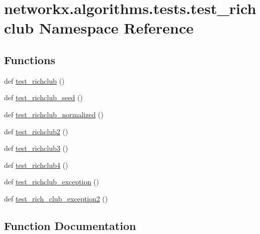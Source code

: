 \hypertarget{namespacenetworkx_1_1algorithms_1_1tests_1_1test__richclub}{}\section{networkx.\+algorithms.\+tests.\+test\+\_\+richclub Namespace Reference}
\label{namespacenetworkx_1_1algorithms_1_1tests_1_1test__richclub}
\subsection*{Functions}
\begin{DoxyCompactItemize}
\item 
def \hyperlink{namespacenetworkx_1_1algorithms_1_1tests_1_1test__richclub_ac3bf15ad9328aa5dfafd7df39ccbac00}{test\+\_\+richclub} ()
\item 
def \hyperlink{namespacenetworkx_1_1algorithms_1_1tests_1_1test__richclub_ac6541c2d71b0cdd6d32eab88f82c7755}{test\+\_\+richclub\+\_\+seed} ()
\item 
def \hyperlink{namespacenetworkx_1_1algorithms_1_1tests_1_1test__richclub_a606b97c9a6f3f88207b464e4b5240576}{test\+\_\+richclub\+\_\+normalized} ()
\item 
def \hyperlink{namespacenetworkx_1_1algorithms_1_1tests_1_1test__richclub_a447f79ecd96065749450bafb2e6ff056}{test\+\_\+richclub2} ()
\item 
def \hyperlink{namespacenetworkx_1_1algorithms_1_1tests_1_1test__richclub_a5e3afa8a189f3d07429be15e3191dc39}{test\+\_\+richclub3} ()
\item 
def \hyperlink{namespacenetworkx_1_1algorithms_1_1tests_1_1test__richclub_a90bf28b5081cfa9643c7307d684d0051}{test\+\_\+richclub4} ()
\item 
def \hyperlink{namespacenetworkx_1_1algorithms_1_1tests_1_1test__richclub_aa185a8f7e00f663918ff1ff7b20e12cf}{test\+\_\+richclub\+\_\+exception} ()
\item 
def \hyperlink{namespacenetworkx_1_1algorithms_1_1tests_1_1test__richclub_a297910369a05be85424cf6ba7efff0d7}{test\+\_\+rich\+\_\+club\+\_\+exception2} ()
\end{DoxyCompactItemize}


\subsection{Function Documentation}
\mbox{\label{namespacenetworkx_1_1algorithms_1_1tests_1_1test__richclub_a297910369a05be85424cf6ba7efff0d7}} 
